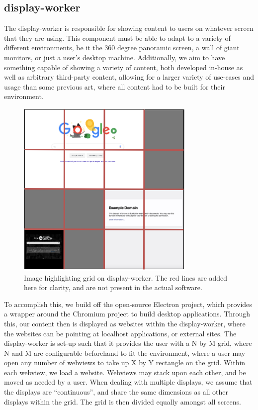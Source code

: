 \subsection{display-worker}

The display-worker is responsible for showing content to users on whatever screen that they are using.
This component must be able to adapt to a variety of different environments, be it the 360 degree
panoramic screen, a wall of giant monitors, or just a user's desktop machine. Additionally, we aim to
have something capable of showing a variety of content, both developed in-house as well as arbitrary
third-party content, allowing for a larger variety of use-cases and usage than some previous art, where
all content had to be built for their environment.

\begin{figure}
    \centering
    \includegraphics[width=0.5\columnwidth]{chapters/02_technology/figures/display_server.png}
    \caption{Image highlighting grid on display-worker. The red lines are added here for clarity, and are not present in the actual software.}
    \label{fig:cycle-cais}
\end{figure}

To accomplish this, we build off the open-source Electron project, which provides a wrapper around the
Chromium project to build desktop applications. Through this, our content then is displayed as websites
within the display-worker, where the websites can be pointing at localhost applications, or external
sites. The display-worker is set-up such that it provides the user with a N by M grid, where N and M are
configurable beforehand to fit the environment, where a user may open any number of webviews to take
up X by Y rectangle on the grid. Within each webview, we load a website. Webviews may stack upon each
other, and be moved as needed by a user. When dealing with multiple displays, we assume that the displays
are ``continuous'', and share the same dimensions as all other displays within the grid. The grid is then
divided equally amongst all screens.



